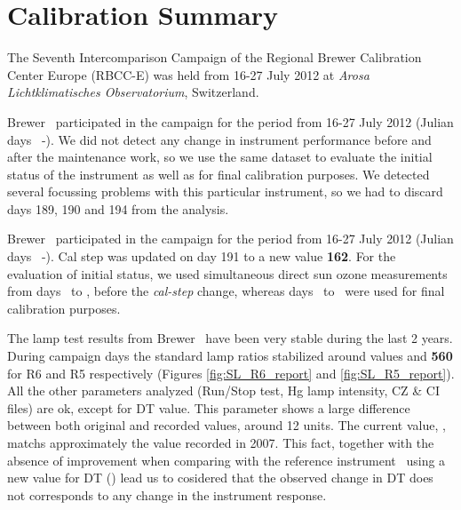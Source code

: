 

\section{Calibration Summary}
The Seventh Intercomparison Campaign of the Regional Brewer Calibration Center Europe (RBCC-E) was held from 16-27 July 2012 at \textit{Arosa Lichtklimatisches Observatorium}, Switzerland.

Brewer \brwname\ participated in the campaign for the period from 16-27 July 2012 (Julian days \CALINI\ -\CALEND). We did not detect any change in instrument performance before and after the maintenance work, so we use the same dataset to evaluate the initial status of the instrument as well as for final calibration purposes. We detected several focussing problems with this particular instrument, so we had to discard days 189, 190 and 194 from the analysis.

Brewer \brwname\ participated in the campaign for the period from 16-27 July 2012 (Julian days \CALINI\ -\CALEND). Cal step was updated on day 191 to a new value \textbf{162}. For the evaluation of initial status, we used \textbf{\NobsCalblind} simultaneous direct sun ozone measurements from days \textbf{\BLINDINI}\ to \textbf{\BLINDEND}, before the \emph{cal-step} change, whereas days \FINALINI\ to \FINALEND\ were used for final calibration purposes.


The lamp test results from Brewer \brwname\ have been very stable during the last 2 years. During campaign days the standard lamp ratios stabilized around values \textbf{\slrefNEW} and \textbf{560} for R6 and R5 respectively (Figures \ref{fig:SL_R6_report} and \ref{fig:SL_R5_report}). All the other parameters analyzed (Run/Stop test, Hg lamp intensity, CZ \& CI files) are ok, except for DT value. This parameter shows a large difference between both original and recorded values, around 12 units. The current value, \DTorig, matchs approximately the value recorded in 2007. This fact, together with the absence of improvement when comparing \brwname with the reference instrument \brwref\ using a new value for DT () lead us to cosidered that the observed change in DT does not corresponds to any change in the instrument response.

